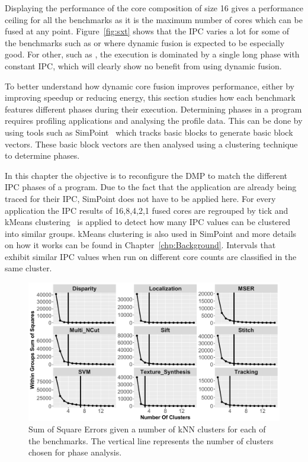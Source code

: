 Displaying the performance of the core composition of size 16 gives a performance ceiling for all the benchmarks as it is the maximum number of cores which can be fused at any point.
Figure~\ref{fig:sxt} shows that the IPC varies a lot for some of the benchmarks such as  or  where dynamic fusion is expected to be especially good.
For other, such as , the execution is dominated by a single long phase with constant IPC, which will clearly show no benefit from using dynamic fusion.

To better understand how dynamic core fusion improves performance, either by improving speedup or reducing energy, this section studies how each benchmark features different phases during their execution.
Determining phases in a program requires profiling applications and analysing the profile data.
This can be done by using tools such as SimPoint~\cite{simpoint} which tracks basic blocks to generate basic block vectors.
These basic block vectors are then analysed using a clustering technique to determine phases.

In this chapter the objective is to reconfigure the DMP to match the different IPC phases of a program.
Due to the fact that the application are already being traced for their IPC, SimPoint does not have to be applied here.
For every application the IPC results of 16,8,4,2,1 fused cores are regrouped by tick and kMeans clustering~\cite{kanungoKMeans02} is applied to detect how many IPC values can be clustered into similar groups.
kMeans clustering is also used in SimPoint and more details on how it works can be found in Chapter~\ref{chp:Background}.
Intervals that exhibit similar IPC values when run on different core counts are classified in the same cluster.

\begin{figure}[t]
    \centering
    \includegraphics[width=1\textwidth]{cases-paper/graphics/Exploration/SSE_final.pdf}
    \caption{Sum of Square Errors given a number of kNN clusters for each of the benchmarks. The vertical line represents the number of clusters chosen for phase analysis.}
    \label{fig:sse}
		\vspace{1em}
\end{figure}

